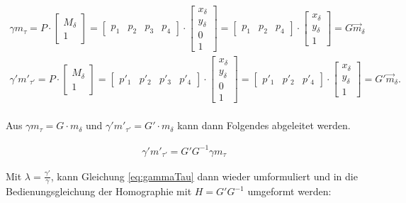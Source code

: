 \begin{gather}
	\gamma m_\tau = P \cdot 
	\begin{bmatrix}
		M_\delta\\1
	\end{bmatrix} = 
	\begin{bmatrix}
		p_1&p_2&p_3&p_4
	\end{bmatrix} \cdot
	\begin{bmatrix}
		x_\delta\\y_\delta\\0\\1
	\end{bmatrix}=
	\begin{bmatrix}
		p_1&p_2&p_4
	\end{bmatrix} \cdot
	\begin{bmatrix}
		x_\delta\\y_\delta\\1
	\end{bmatrix}=
	G \vec{m}_\delta\\
	\gamma' m'_{\tau'} = P \cdot 
	\begin{bmatrix}
		M_\delta\\1
	\end{bmatrix} = 
	\begin{bmatrix}
		p'_1&p'_2&p'_3&p'_4
	\end{bmatrix} \cdot
	\begin{bmatrix}
		x_\delta\\y_\delta\\0\\1
	\end{bmatrix}=
	\begin{bmatrix}
		p'_1&p'_2&p'_4
	\end{bmatrix} \cdot
	\begin{bmatrix}
		x_\delta\\y_\delta\\1
	\end{bmatrix}=
	G' \vec{m}_{\delta}. 
\end{gather}\\


Aus $\gamma m_\tau = G\cdot m_\delta$ und $\gamma' m'_{\tau'} = G'\cdot m_{\delta}$ kann dann Folgendes abgeleitet werden\cite{Elements}.

\begin{gather}
	\gamma' m'_{\tau'} = G' G^{-1} \gamma m_\tau \label{eq:gammaTau}
\end{gather}

Mit $\lambda= \frac{\gamma'}{\gamma}$, kann Gleichung \ref{eq:gammaTau} dann wieder umformuliert und in die Bedienungsgleichung der Homographie mit $H=G' G^{-1}$ umgeformt werden:

